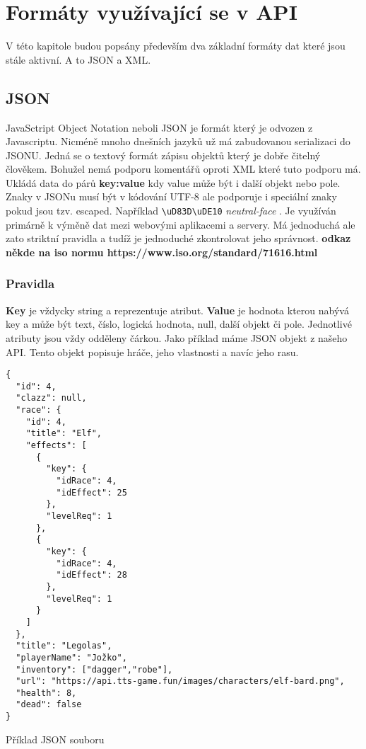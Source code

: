 \chapter{Formáty využívající se v API}
V této kapitole budou popsány především dva základní formáty dat které jsou stále aktivní. A to JSON a XML.

\section{JSON}
JavaSctript Object Notation neboli JSON je formát který je odvozen z Javascriptu. Nicméně mnoho dnešních jazyků už má zabudovanou serializaci do JSONU. Jedná se o textový formát zápisu objektů který je dobře čitelný člověkem. Bohužel nemá podporu komentářů oproti XML které tuto podporu má. Ukládá data do párů \textbf{key:value} kdy value může být i další objekt nebo pole. Znaky v JSONu musí být v kódování UTF-8 ale podporuje i speciální znaky pokud jsou tzv. escaped. Například \verb |\uD83D\uDE10| \textit{neutral-face} . Je využíván primárně k výměně dat mezi webovými aplikacemi a  servery. Má jednoduchá ale zato striktní pravidla a tudíž je jednoduché zkontrolovat jeho správnost. \textbf{odkaz někde na iso normu https://www.iso.org/standard/71616.html} %


\subsection{Pravidla}
\textbf{Key} je vždycky string a reprezentuje atribut. \textbf{Value} je hodnota kterou nabývá key a může být text, číslo, logická hodnota, null, další objekt či pole. Jednotlivé atributy jsou vždy odděleny čárkou. Jako příklad máme JSON objekt z našeho API. Tento objekt popisuje hráče, jeho vlastnosti a navíc jeho rasu.

\newpage

\begin{listing}
    \begin{verbatim}
{
  "id": 4,
  "clazz": null,
  "race": {
    "id": 4,
    "title": "Elf",
    "effects": [
      {
        "key": {
          "idRace": 4,
          "idEffect": 25
        },
        "levelReq": 1
      },
      {
        "key": {
          "idRace": 4,
          "idEffect": 28
        },
        "levelReq": 1
      }
    ]
  },
  "title": "Legolas",
  "playerName": "Jožko",
  "inventory": ["dagger","robe"],
  "url": "https://api.tts-game.fun/images/characters/elf-bard.png",
  "health": 8,
  "dead": false
}
  \end{verbatim}
    \caption{Příklad JSON souboru}
    \label{code:sumaradyasm}
\end{listing}

